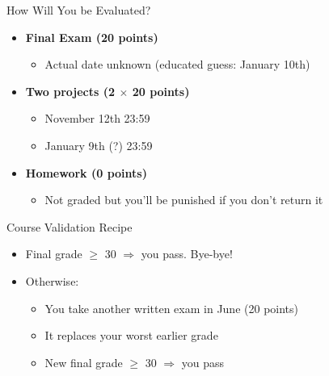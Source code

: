 \documentclass[10pt]{beamer}
\begin{document}
\begin{frame}
  \begin{block}{How Will You be Evaluated?}
    \begin{itemize}
    \item \textbf{Final Exam (20 points)} 
      \begin{itemize}
      \item Actual date unknown (educated guess: January 10th)
      \end{itemize}

      \medskip
      
    \item \textbf{Two projects (2 $\times$ 20 points)} 
      \begin{itemize}
      \item November 12th 23:59
      \item January 9th (?) 23:59
      \end{itemize}
      
      \medskip

    \item \textbf{Homework (0 points)} 
      \begin{itemize}
      \item Not graded but you'll be punished if you don't return it
      \end{itemize}
    \end{itemize}
  \end{block}

  \begin{alertblock}{Course Validation Recipe}
    \begin{itemize}
    \item Final grade $\geq$ 30 $\Longrightarrow$ you pass. Bye-bye!
    \item Otherwise:
      \begin{itemize}
      \item You take another written exam in June (20 points)
      \item It replaces your worst earlier grade
      \item New final grade $\geq$ 30 $\Longrightarrow$ you pass
      \end{itemize}
    \end{itemize}
  \end{alertblock}
\end{frame}

\end{document}

